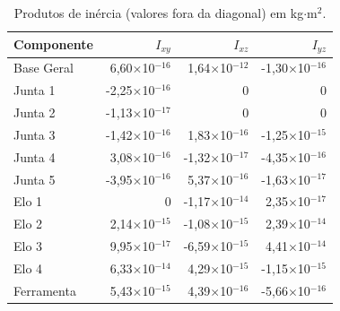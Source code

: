 \begin{table}[H]
\centering
\caption{Produtos de inércia (valores fora da diagonal) em kg$\cdot$m$^{2}$.}
\label{tab:inercias_prod_kgm2}
\begin{tabular}{l rrr}
\hline
\textbf{Componente} & $I_{xy}$ & $I_{xz}$ & $I_{yz}$ \\
\hline
Base Geral   & 6,60$\times$10$^{-16}$ & 1,64$\times$10$^{-12}$ & -1,30$\times$10$^{-16}$ \\
Junta 1      & -2,25$\times$10$^{-16}$ & 0 & 0 \\
Junta 2      & -1,13$\times$10$^{-17}$ & 0 & 0 \\
Junta 3      & -1,42$\times$10$^{-16}$ & 1,83$\times$10$^{-16}$ & -1,25$\times$10$^{-15}$ \\
Junta 4      & 3,08$\times$10$^{-16}$ & -1,32$\times$10$^{-17}$ & -4,35$\times$10$^{-16}$ \\
Junta 5      & -3,95$\times$10$^{-16}$ & 5,37$\times$10$^{-16}$ & -1,63$\times$10$^{-17}$ \\
Elo 1        & 0 & -1,17$\times$10$^{-14}$ & 2,35$\times$10$^{-17}$ \\
Elo 2        & 2,14$\times$10$^{-15}$ & -1,08$\times$10$^{-15}$ & 2,39$\times$10$^{-14}$ \\
Elo 3        & 9,95$\times$10$^{-17}$ & -6,59$\times$10$^{-15}$ & 4,41$\times$10$^{-14}$ \\
Elo 4        & 6,33$\times$10$^{-14}$ & 4,29$\times$10$^{-15}$ & -1,15$\times$10$^{-15}$ \\
Ferramenta   & 5,43$\times$10$^{-15}$ & 4,39$\times$10$^{-16}$ & -5,66$\times$10$^{-16}$ \\
\hline
\end{tabular}
\end{table}




